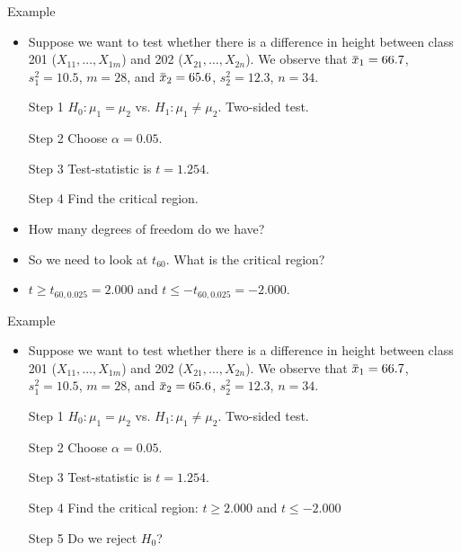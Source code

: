\documentclass[10pt, xcolor=table]{beamer}
\newcommand{\overbar}[1]{\mkern 1.5mu\overline{\mkern-1.5mu#1\mkern-1.5mu}\mkern 1.5mu}
\begin{document}
\begin{frame}{Example}
\begin{itemize}
\setlength{\itemsep}{8pt}
\item Suppose we want to test whether there is a difference in height between class 201 ($X_{11}, \dots, X_{1m}$)  and 202 ($X_{21}, \dots, X_{2n}$). We observe that $\overbar{x}_1 = 66.7$, $s_1^2 = 10.5$, $m = 28$, and $\overbar{x}_2 = 65.6$, $s_2^2 = 12.3$, $n = 34$. 
\item[Step 1] $H_0: \mu_1 = \mu_2$ vs. $H_1: \mu_1 \neq \mu_2$. Two-sided test.   
\item[Step 2] Choose $\alpha = 0.05$. 
\item[Step 3] Test-statistic is $t = 1.254$.
\item[Step 4] Find the critical region.
\item<2->[] How many degrees of freedom do we have? 
\item<4->[] So we need to look at $t_{60}$. What is the critical region?
\item<5->[] $t \geq t_{60, 0.025} = 2.000$ and $t \leq -t_{60, 0.025} = -2.000$.
\end{itemize}
\end{frame}

\begin{frame}{Example}
\begin{itemize}
\setlength{\itemsep}{12pt}
\item Suppose we want to test whether there is a difference in height between class 201 ($X_{11}, \dots, X_{1m}$)  and 202 ($X_{21}, \dots, X_{2n}$). We observe that $\overbar{x}_1 = 66.7$, $s_1^2 = 10.5$, $m = 28$, and $\overbar{x}_2 = 65.6$, $s_2^2 = 12.3$, $n = 34$. 
\item[Step 1] $H_0: \mu_1 = \mu_2$ vs. $H_1: \mu_1 \neq \mu_2$. Two-sided test.   
\item[Step 2] Choose $\alpha = 0.05$. 
\item[Step 3] Test-statistic is $t = 1.254$.
\item[Step 4] Find the critical region: $t \geq 2.000$ and $t \leq -2.000$
\item[Step 5] Do we reject $H_0$? 
\end{itemize}
\end{frame}
\end{document}
